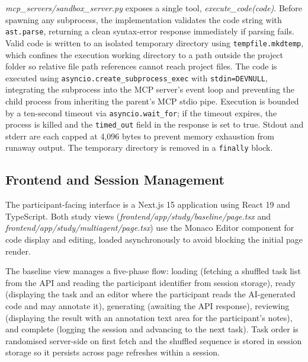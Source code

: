 \textit{mcp\_servers/sandbox\_server.py} exposes a single tool, \textit{execute\_code(code)}. Before spawning any subprocess, the implementation validates the code string with \texttt{ast.parse}, returning a clean syntax-error response immediately if parsing fails. Valid code is written to an isolated temporary directory using \texttt{tempfile.mkdtemp}, which confines the execution working directory to a path outside the project folder so relative file path references cannot reach project files. The code is executed using \texttt{asyncio.create\_subprocess\_exec} with \texttt{stdin=DEVNULL}, integrating the subprocess into the MCP server's event loop and preventing the child process from inheriting the parent's MCP stdio pipe. Execution is bounded by a ten-second timeout via \texttt{asyncio.wait\_for}; if the timeout expires, the process is killed and the \texttt{timed\_out} field in the response is set to true. Stdout and stderr are each capped at 4,096 bytes to prevent memory exhaustion from runaway output. The temporary directory is removed in a \texttt{finally} block.

\subsection{Frontend and Session Management}

The participant-facing interface is a Next.js 15 application using React 19 and TypeScript. Both study views (\textit{frontend/app/study/baseline/page.tsx} and \textit{frontend/app/study/multiagent/page.tsx}) use the Monaco Editor component for code display and editing, loaded asynchronously to avoid blocking the initial page render.

The baseline view manages a five-phase flow: loading (fetching a shuffled task list from the API and reading the participant identifier from session storage), ready (displaying the task and an editor where the participant reads the AI-generated code and may annotate it), generating (awaiting the API response), reviewing (displaying the result with an annotation text area for the participant's notes), and complete (logging the session and advancing to the next task). Task order is randomised server-side on first fetch and the shuffled sequence is stored in session storage so it persists across page refreshes within a session.

